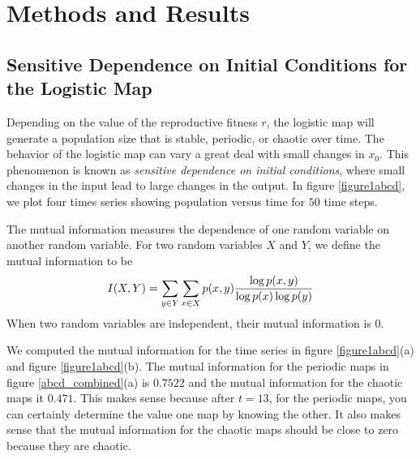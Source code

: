 \documentclass[conference]{IEEEtran}
\begin{document}




\section{Methods and Results}

\subsection{Sensitive Dependence on Initial Conditions for the Logistic Map}

Depending on the value of the reproductive fitness $r$, the logistic map will generate a population size that is stable, periodic, or chaotic over time.  The behavior of the logistic map can vary a great deal with small changes in $x_0$.  This phenomenon is known as {\it sensitive dependence on initial conditions}, where small changes in the input lead to large changes in the output.  In figure \ref{figure1abcd}, we plot four times series showing population versus time for $50$ time steps.   

The mutual information measures the dependence of one random variable on another random variable.   For two random variables $X$ and $Y$, we define the mutual information to be
\begin{eqnarray}
I(X,Y) = \sum_{y \in Y} \sum_ {x \in X} p(x,y) { \log p(x,y) \over {\log p(x)  \log p(y)} }
\end{eqnarray}
When two random variables are independent, their mutual information is $0$.  

We computed the mutual information for the time series in figure \ref{figure1abcd}(a) and figure \ref{figure1abcd}(b).  
The mutual information for the periodic maps in figure \ref{abcd_combined}(a)  is $0.7522$ and the mutual information for the chaotic maps it $0.471$.   This makes sense because after $t=13$, for the periodic maps, you can certainly determine the value one map by knowing the other.  It also makes sense that the mutual information for the chaotic maps should be close to zero because they are chaotic.  
\end{document}
